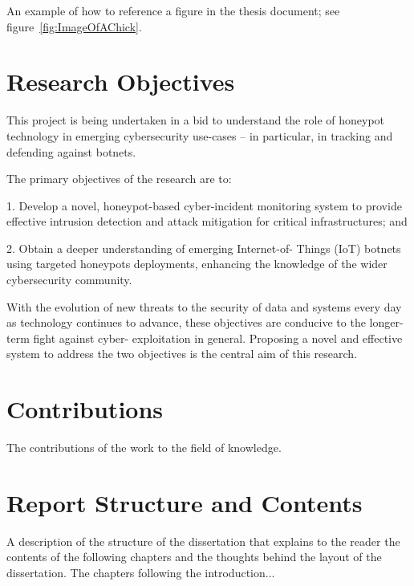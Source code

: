 An example of how to reference a figure in the thesis document; see figure~\ref{fig:ImageOfAChick}.



\section{Research Objectives} 
This project is being undertaken in a bid to understand the role of honeypot technology in emerging
cybersecurity use-cases – in particular, in tracking and defending against botnets.

The primary objectives of the research are to:

1. Develop a novel, honeypot-based cyber-incident monitoring system to provide effective
intrusion detection and attack mitigation for critical infrastructures; and

2. Obtain a deeper understanding of emerging Internet-of- Things (IoT) botnets using targeted
honeypots deployments, enhancing the knowledge of the wider cybersecurity community.

With the evolution of new threats to the security of data and systems every day as technology
continues to advance, these objectives are conducive to the longer-term fight against cyber-
exploitation in general. Proposing a novel and effective system to address the two objectives is the
central aim of this research.

\section{Contributions}

The contributions of the work to the field of knowledge.

\section{Report Structure and Contents}

A description of the structure of the dissertation that explains to the reader the contents of the following chapters and the thoughts behind the layout of the dissertation. The chapters following the introduction...